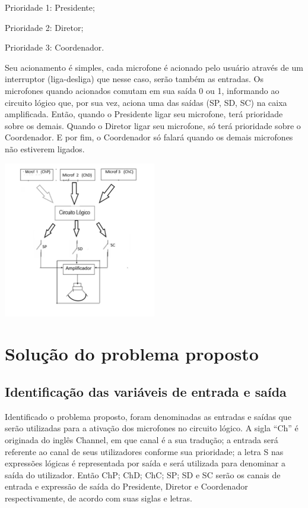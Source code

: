 \documentclass{article}
\begin{document}
Prioridade 1: Presidente;

Prioridade 2: Diretor;

Prioridade 3: Coordenador.

Seu acionamento é simples, cada microfone é acionado pelo usuário através de um interruptor (liga-desliga) que nesse caso, serão também as entradas. Os microfones quando acionados comutam em sua saída 0 ou 1, informando ao circuito lógico que, por sua vez, aciona uma das saídas (SP, SD, SC) na caixa amplificada. Então, quando o Presidente ligar seu microfone, terá prioridade sobre os demais. Quando o Diretor ligar seu microfone, só terá prioridade sobre o Coordenador. E por fim, o Coordenador só falará quando os demais microfones não estiverem ligados.

\vspace{15mm}
\begin{center}
\includegraphics[width=0.5\textwidth]{esbocoroubado}
\end{center}

\section{Solução do problema proposto}

\subsection{Identificação das variáveis de entrada e saída}
Identificado o problema proposto, foram denominadas as entradas e saídas que serão utilizadas para a ativação dos microfones no circuito lógico. A sigla “Ch” é originada do inglês Channel, em que canal é a sua tradução; a entrada será referente ao canal de seus utilizadores conforme sua prioridade; a letra S nas expressões lógicas é representada por saída e será utilizada para denominar a saída do utilizador. Então ChP; ChD; ChC; SP; SD e SC serão os canais de entrada e expressão de saída do Presidente, Diretor e Coordenador respectivamente, de acordo com suas siglas e letras.
\end{document}
